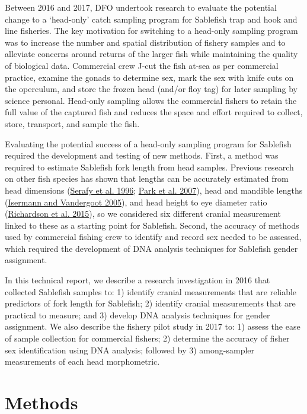 \documentclass[12pt]{article}\usepackage[]{graphicx}\usepackage[]{color}
\begin{document}
Between 2016 and 2017, DFO undertook research to evaluate the potential change to a `head-only' catch sampling program for Sablefish trap and hook and line fisheries. The key motivation for switching to a head-only sampling program was to increase the number and spatial distribution of fishery samples and to alleviate concerns around returns of the larger fish while maintaining the quality of biological data. Commercial crew J-cut the fish at-sea as per commercial practice, examine the gonads to determine sex, mark the sex with knife cuts on the operculum, and store the frozen head (and/or floy tag) for later sampling by science personal. Head-only sampling allows the commercial fishers to retain the full value of the captured fish and reduces the space and effort required to collect, store, transport, and sample the fish.

Evaluating the potential success of a head-only sampling program for Sablefish required the development and testing of new methods. First, a method was required to estimate Sablefish fork length from head samples. Previous research on other fish species has shown that lengths can be accurately estimated from head dimensions (\protect\hyperlink{ref-Serafy1996}{Serafy et al. 1996}; \protect\hyperlink{ref-Park2007}{Park et al. 2007}), head and mandible lengths (\protect\hyperlink{ref-Isermann2005}{Isermann and Vandergoot 2005}), and head height to eye diameter ratio (\protect\hyperlink{ref-Richardson2015}{Richardson et al. 2015}), so we considered six different cranial measurement linked to these as a starting point for Sablefish. Second, the accuracy of methods used by commercial fishing crew to identify and record sex needed to be assessed, which required the development of DNA analysis techniques for Sablefish gender assignment.

In this technical report, we describe a research investigation in 2016 that collected Sablefish samples to: 1) identify cranial measurements that are reliable predictors of fork length for Sablefish; 2) identify cranial measurements that are practical to measure; and 3) develop DNA analysis techniques for gender assignment. We also describe the fishery pilot study in 2017 to: 1) assess the ease of sample collection for commercial fishers; 2) determine the accuracy of fisher sex identification using DNA analysis; followed by 3) among-sampler measurements of each head morphometric.

\clearpage

\hypertarget{methods}{%
\section{Methods}\label{methods}}
\end{document}

